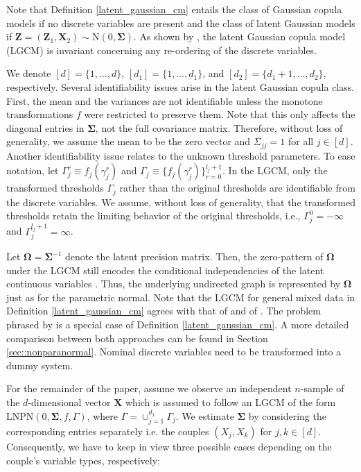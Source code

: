 Note that Definition \ref{latent_gaussian_cm} entails the class of Gaussian copula models if no discrete variables are present and the class of latent Gaussian models if $\mathbf{Z} = (\mathbf{Z}_1, \mathbf{X}_2) \sim \text{N}(0, \mathbf{\Sigma})$. As shown by \citet{Fan17}, the latent Gaussian copula model (LGCM) is invariant concerning any re-ordering of the discrete variables.

We denote \([d] = \{1,\dots,d\}\), \([d_1] = \{1,\dots,d_1\}\), and \([d_2] = \{d_1 +1, \dots, d_2\}\), respectively. Several identifiability issues arise in the latent Gaussian copula class.
First, the mean and the variances are not identifiable unless the monotone transformations \(f\) were restricted to preserve them. Note that this only affects the diagonal entries in \(\mathbf\Sigma\), not the full covariance matrix. Therefore, without loss of generality, we assume the mean to be the zero vector and \(\Sigma_{jj} = 1\) for all \(j \in [d]\). Another identifiability issue relates to the unknown threshold parameters. To ease notation, let \(\Gamma_j^r \equiv f_j(\gamma_j^r)\) and \(\Gamma_j \equiv \{f_j(\gamma_j^r)\}_{r=0}^{l_j+1}\). In the LGCM, only the transformed thresholds \(\Gamma_j\) rather than the original thresholds are identifiable from the discrete variables. We assume, without loss of generality, that the transformed thresholds retain the limiting behavior of the original thresholds, i.e., \(\Gamma_{j}^{0} = -\infty\) and \(\Gamma_j^{l_j+1} = \infty\).

Let $\mathbf{\Omega}= \mathbf{\Sigma}^{-1}$ denote the latent precision matrix. Then, the zero-pattern of $\mathbf{\Omega}$ under the LGCM still encodes the conditional independencies of the latent continuous variables \cite{Liu09}. Thus, the underlying undirected graph is represented by $\mathbf{\Omega}$ just as for the parametric normal. Note that the LGCM for general mixed data in Definition \ref{latent_gaussian_cm} agrees with that of \citet{Quan18} and of \citet{Feng19}. The problem phrased by \citet{Fan17} is a special case of  Definition \ref{latent_gaussian_cm}. A more detailed comparison between both approaches can be found in Section \ref{sec::nonparanormal}. Nominal discrete variables need to be transformed into a dummy system.

For the remainder of the paper, assume we observe an independent $n$-sample of the $d$-dimensional vector $\mathbf{X}$ which is assumed to follow an LGCM of the form \(\text{LNPN}(0, \mathbf{\Sigma}, f, \Gamma)\), where \(\Gamma = \cup_{j=1}^{d_1}\Gamma_j\). We estimate $\mathbf{\Sigma}$ by considering the corresponding entries separately i.e. the couples $(X_j, X_k)$ for \(j,k \in [d]\). Consequently, we have to keep in view three possible cases depending on the couple's variable types, respectively:

